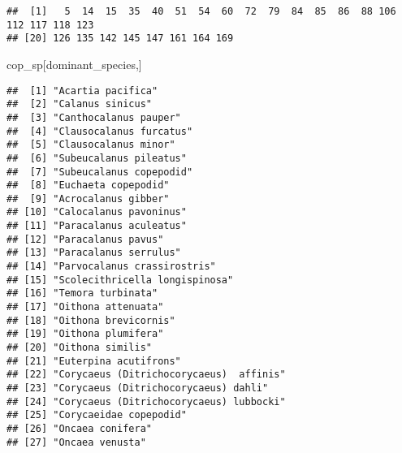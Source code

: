 \documentclass[
]{article}
\newenvironment{Shaded}{\begin{snugshade}}{\end{snugshade}}
\newcommand{\NormalTok}[1]{#1}
\begin{document}
\begin{verbatim}
##  [1]   5  14  15  35  40  51  54  60  72  79  84  85  86  88 106 112 117 118 123
## [20] 126 135 142 145 147 161 164 169
\end{verbatim}

\begin{Shaded}
\begin{Highlighting}[]
\NormalTok{cop\_sp[dominant\_species,]}
\end{Highlighting}
\end{Shaded}

\begin{verbatim}
##  [1] "Acartia pacifica"                      
##  [2] "Calanus sinicus"                       
##  [3] "Canthocalanus pauper"                  
##  [4] "Clausocalanus furcatus"                
##  [5] "Clausocalanus minor"                   
##  [6] "Subeucalanus pileatus"                 
##  [7] "Subeucalanus copepodid"                
##  [8] "Euchaeta copepodid"                    
##  [9] "Acrocalanus gibber"                    
## [10] "Calocalanus pavoninus"                 
## [11] "Paracalanus aculeatus"                 
## [12] "Paracalanus pavus"                     
## [13] "Paracalanus serrulus"                  
## [14] "Parvocalanus crassirostris"            
## [15] "Scolecithricella longispinosa"         
## [16] "Temora turbinata"                      
## [17] "Oithona attenuata"                     
## [18] "Oithona brevicornis"                   
## [19] "Oithona plumifera"                     
## [20] "Oithona similis"                       
## [21] "Euterpina acutifrons"                  
## [22] "Corycaeus (Ditrichocorycaeus)  affinis"
## [23] "Corycaeus (Ditrichocorycaeus) dahli"   
## [24] "Corycaeus (Ditrichocorycaeus) lubbocki"
## [25] "Corycaeidae copepodid"                 
## [26] "Oncaea conifera"                       
## [27] "Oncaea venusta"
\end{verbatim}
\end{document}
